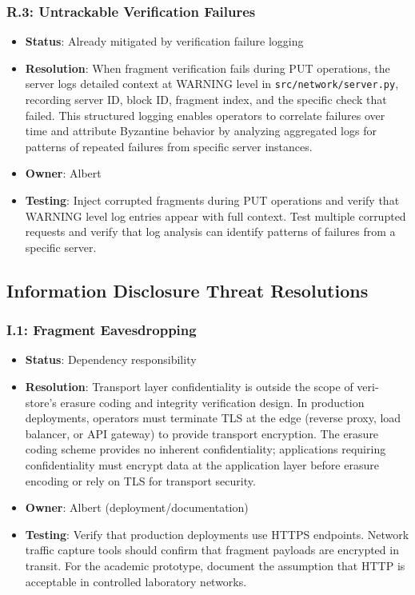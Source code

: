 \documentclass[../veristore_security_model.tex]{subfiles}
\begin{document}
\subsubsection{R.3: Untrackable Verification Failures}
\begin{itemize}
\item \textbf{Status}: Already mitigated by verification failure logging
\item \textbf{Resolution}: When fragment verification fails during PUT operations, the server logs detailed context at WARNING level in \texttt{src/network/server.py}, recording server ID, block ID, fragment index, and the specific check that failed. This structured logging enables operators to correlate failures over time and attribute Byzantine behavior by analyzing aggregated logs for patterns of repeated failures from specific server instances.
\item \textbf{Owner}: Albert
\item \textbf{Testing}: Inject corrupted fragments during PUT operations and verify that WARNING level log entries appear with full context. Test multiple corrupted requests and verify that log analysis can identify patterns of failures from a specific server.
\end{itemize}

\subsection{Information Disclosure Threat Resolutions}

\subsubsection{I.1: Fragment Eavesdropping}
\begin{itemize}
\item \textbf{Status}: Dependency responsibility
\item \textbf{Resolution}: Transport layer confidentiality is outside the scope of veri-store's erasure coding and integrity verification design. In production deployments, operators must terminate TLS at the edge (reverse proxy, load balancer, or API gateway) to provide transport encryption. The erasure coding scheme provides no inherent confidentiality; applications requiring confidentiality must encrypt data at the application layer before erasure encoding or rely on TLS for transport security.
\item \textbf{Owner}: Albert (deployment/documentation)
\item \textbf{Testing}: Verify that production deployments use HTTPS endpoints. Network traffic capture tools should confirm that fragment payloads are encrypted in transit. For the academic prototype, document the assumption that HTTP is acceptable in controlled laboratory networks.
\end{itemize}
\end{document}
